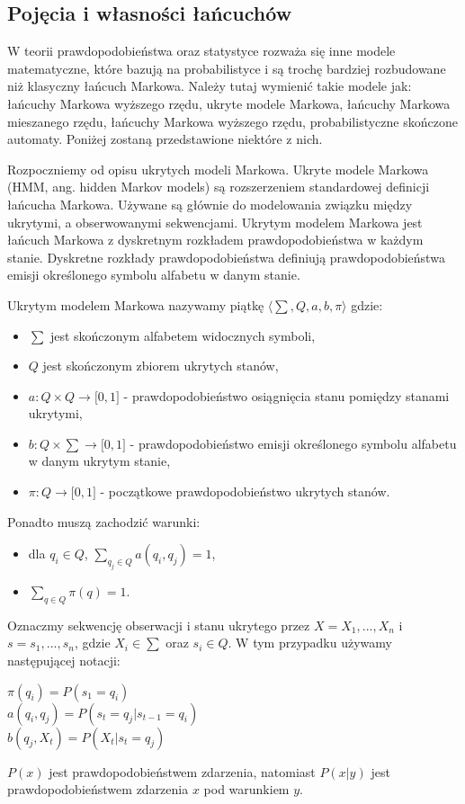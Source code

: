 \subsection{Pojęcia i własności łańcuchów}
	
	W teorii prawdopodobieństwa oraz statystyce rozważa się inne modele matematyczne, które bazują na probabilistyce i są trochę bardziej rozbudowane niż klasyczny łańcuch Markowa. Należy tutaj wymienić takie modele jak: łańcuchy Markowa wyższego rzędu, ukryte modele Markowa, łańcuchy Markowa mieszanego rzędu, łańcuchy Markowa wyższego rzędu, probabilistyczne skończone automaty. Poniżej zostaną przedstawione niektóre z nich.
	

	Rozpoczniemy od opisu ukrytych modeli Markowa. Ukryte modele Markowa (HMM, ang. hidden Markov models) są rozszerzeniem standardowej definicji łańcucha Markowa. Używane są głównie do modelowania związku między ukrytymi, a obserwowanymi sekwencjami. Ukrytym modelem Markowa jest łańcuch Markowa z dyskretnym rozkładem prawdopodobieństwa w każdym stanie. Dyskretne rozkłady prawdopodobieństwa definiują prawdopodobieństwa emisji określonego symbolu alfabetu w danym stanie. 

\begin{definicja}
	Ukrytym modelem Markowa nazywamy piątkę $ \langle \sum, Q, a, b, \pi  \rangle$ gdzie:
	\begin{itemize}
		\item $\sum$ jest skończonym alfabetem widocznych symboli,
		\item $Q$ jest skończonym zbiorem ukrytych stanów,
		\item $a: Q \times Q \rightarrow \lbrack 0, 1 \rbrack$ - prawdopodobieństwo osiągnięcia stanu pomiędzy stanami ukrytymi,
		\item $b: Q \times \sum \rightarrow \lbrack 0, 1 \rbrack$ - prawdopodobieństwo emisji określonego symbolu alfabetu w danym ukrytym stanie,
		\item $\pi: Q \rightarrow \lbrack 0, 1 \rbrack$ - początkowe prawdopodobieństwo ukrytych stanów.
	\end{itemize}
	Ponadto muszą zachodzić warunki:
	\begin{itemize}
		\item dla $q_{i} \in Q$, $\sum_{q_{j} \in Q} a(q_{i}, q_{j}) = 1$,
		\item $\sum_{q \in Q} \pi(q) = 1.$
	\end{itemize}	
	
	Oznaczmy sekwencję obserwacji i stanu ukrytego przez $X = X_{1}, ..., X_{n}$ i $s = s_{1}, ..., s_{n}$, gdzie $X_{i} \in \sum$ oraz $s_{i} \in Q$. W tym przypadku używamy następującej notacji:
	\begin{center}
		$\pi(q_{i}) = P(s_{1} = q_{i})$ \\
		$a(q_{i},q_{j}) = P(s_{t} = q_{j} | s_{t-1} = q_{i})$ \\
		$b(q_{j},X_{t}) = P(X_{t} | s_{t} = q_{j})$
	\end{center}  
	$P(x)$ jest prawdopodobieństwem zdarzenia, natomiast $P(x | y)$ jest prawdopodobieństwem zdarzenia $x$ pod warunkiem $y$.
\end{definicja}

